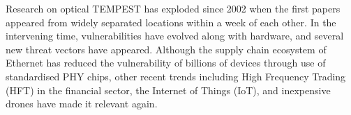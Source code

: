 Research on optical TEMPEST has exploded since 2002 when the first papers
appeared from widely separated locations within a week of each other. In the
intervening time, vulnerabilities have evolved along with hardware, and
several new threat vectors have appeared. Although the supply chain ecosystem
of Ethernet has reduced the vulnerability of billions of devices through use
of standardised PHY chips, other recent trends including High Frequency
Trading (HFT) in the financial sector, the Internet of Things (IoT), and
inexpensive drones have made it relevant again.
